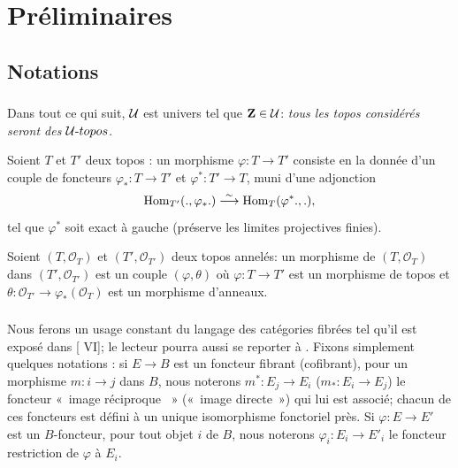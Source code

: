 \documentclass[10pt]{../fichiers-configuration-latex/smfart}
\begin{document}
\section{Préliminaires}

\subsection{Notations}

\subsubsection{}
Dans tout ce qui suit, ${\mathcal U}$ est univers tel que $\mathbf{Z} \in
{\mathcal U}$: \emph{tous les topos considérés seront des
${\mathcal U}\text{-}topos$.}

Soient $T$ et $T'$ deux topos : un morphisme $\varphi : T \to T'$
consiste en la donnée d'un couple de foncteurs $\varphi_{\ast} : T \to
T'$ et $\varphi^{\ast} : T'\to T$, muni d'une adjonction
$$\operatorname{Hom}_{T'}(.,\varphi_{\ast}.) \overset{\sim}{\longrightarrow}{\operatorname{Hom}}_{T}(\varphi^{\ast} . ,
.),$$ tel que $\varphi^{\ast}$ soit exact à gauche (\ie préserve les
limites projectives finies).

Soient $(T, \mathcal{O}_{T})$ et $(T', \mathcal{O}_{T'})$ deux topos annelés:
un morphisme de $(T, \mathcal{O}_{T})$ dans $(T', \mathcal{O}_{T'})$ est un
couple $(\varphi, \theta)$ où $\varphi : T \to T'$ est un morphisme de
topos et $\theta : \mathcal{O}_{T'} \to \varphi_{\ast}
(\mathcal{O}_T)$ est un morphisme d'anneaux.

\subsubsection{}
Nous ferons un usage constant du langage des catégories fibrées tel qu'il est
exposé dans [ VI]; le lecteur pourra aussi se reporter à \cite{SGA4-05bis:4}.
Fixons simplement quelques notations : si $E \to B$ est un foncteur fibrant
(\resp cofibrant), pour un morphisme $m : i \to j$ dans $B$, nous noterons
$m^{\ast} : E_{j} \to E_i$ (\resp $m_{\ast} : E_i \to E_j$) le foncteur « image réciproque  » (\resp \pageoriginale « image directe ») qui lui
est associé; chacun de ces foncteurs est défini à un unique isomorphisme
fonctoriel près. Si $\varphi : E \to E'$ est un $B$-foncteur, pour tout
objet $i$ de $B$, nous noterons $\varphi_i : E_i \to E'_i$ le foncteur
restriction de $\varphi$ à $E_i$.
\end{document}

